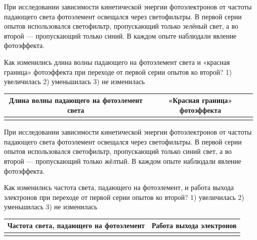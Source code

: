 \begin{taskbasic}[code={\label{task:photo_green_to_blue_lambda_and_redline}}]
При исследовании зависимости кинетической энергии фотоэлектронов от частоты падающего света фотоэлемент освещался через светофильтры. В первой серии опытов использовался светофильтр, пропускающий только зелёный свет, а во второй --- пропускающий только синий. В каждом опыте наблюдали явление фотоэффекта.

Как изменились длина волны падающего на фотоэлемент света и «красная граница» фотоэффекта при переходе от первой серии опытов ко второй?
1) увеличилась
2) уменьшилась
3) не изменилась

\nopagebreak\smallskip
\begin{center}
\small
\begin{tabular}{|c|c|}
\hline
Длина волны падающего на фотоэлемент света & «Красная граница» фотоэффекта \\ \hline
 & \\ \hline
\end{tabular}
\end{center}

\end{taskbasic}

\begin{taskbasic}[code={\label{task:photo_blue_to_yellow_freq_and_work}}]
При исследовании зависимости кинетической энергии фотоэлектронов от частоты падающего света фотоэлемент освещался через светофильтры. В первой серии опытов использовался светофильтр, пропускающий только синий свет, а во второй --- пропускающий только жёлтый. В каждом опыте наблюдали явление фотоэффекта.

Как изменились частота света, падающего на фотоэлемент, и работа выхода электронов при переходе от первой серии опытов ко второй?
1) увеличилась
2) уменьшилась
3) не изменилась

\nopagebreak\smallskip
\begin{center}
\small
\begin{tabular}{|c|c|}
\hline
Частота света, падающего на фотоэлемент & Работа выхода электронов \\ \hline
 & \\ \hline
\end{tabular}
\end{center}

\end{taskbasic}

